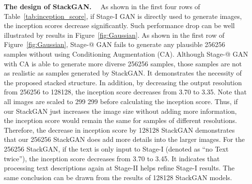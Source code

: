 \documentclass[10pt,twocolumn,letterpaper]{article}
\makeatletter
\newcommand{\Rmnum}[1]{\expandafter\@slowromancap\romannumeral #1@}
\makeatother
\begin{document}
\textbf{The design of StackGAN.}　
As shown in the first four rows of Table~\ref{tab:inception_score}, if Stage-I GAN is directly used to generate images, the inception scores decrease significantly. Such performance drop can be well illustrated by results in Figure~\ref{fig:Gaussian}. As shown in the first row of Figure~\ref{fig:Gaussian}, Stage-\Rmnum{1} GAN fails to generate any plausible 256256 samples without using Conditioning Augmentation (CA). Although Stage-\Rmnum{1} GAN with CA is able to generate more diverse 256256 samples, those samples are not as realistic as samples generated by StackGAN. It demonstrates the necessity of the proposed stacked structure. In addition, by decreasing the output resolution from 256256 to 128128, the inception score decreases from 3.70 to 3.35. 
Note that all images are scaled to 299  299 before calculating the inception score. Thus, if our StackGAN just increases the image size without adding more information, the inception score would remain the same for samples of different resolutions. Therefore, the decrease in inception score by 128128 StackGAN demonstrates that our 256256 StackGAN does add more details into the larger images. For the 256256 StackGAN, if the text is only input to Stage-I (denoted as ``no Text twice''), the inception score decreases from 3.70 to 3.45. It indicates that processing text descriptions again at Stage-II helps refine Stage-I results. The same conclusion can be drawn from the results of 128128 StackGAN models. 
\end{document}
